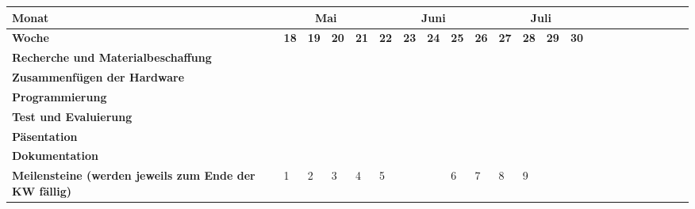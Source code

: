 \documentclass[lang=ngerman,inputenc=utf8,fontsize=10pt]{ldvarticle}
\begin{document}
\begin{center}
\begin{footnotesize}
\setlength{\arrayrulewidth}{1,05pt}
\begin{tabular}[htb]{|m{}|p{.05cm}|p{.05cm}|p{.05cm}|p{.05cm}|p{.05cm}|p{.05cm}|p{.05cm}|p{.05cm}|p{.05cm}|p{.05cm}|p{.05cm}|p{.05cm}|p{.05cm}|p{.05cm}|p{.05cm}|p{.05cm}|p{.05cm}|p{.05cm}|p{.05cm}|p{.05cm}|p{.05cm}|p{.05cm}|}
\hline
\textbf{Monat}& \multicolumn{4}{|c|}{Mai} & \multicolumn{5}{|c|}{Juni} & \multicolumn{4}{|c|}{Juli} \\
\hline
\textbf{Woche}&\tiny\textbf{18}&\tiny\textbf{19}&\tiny\textbf{20}&\tiny\textbf{21}& \tiny \textbf{22} & \tiny \textbf{23} & \tiny \textbf{24} & \tiny \textbf{25} & \tiny \textbf{26} & \tiny \textbf{27} & \tiny \textbf{28} & \tiny \textbf{29} & \tiny \textbf{30}\\
\hline

\rowcolor{lightgray} \textbf{Recherche und Materialbeschaffung}& \cellcolor{red} &\cellcolor{red} & & & & & & & & & & & \\
\hline
\rowcolor{lightgray} \textbf{Zusammenfügen der Hardware}& &\cellcolor{red} &\cellcolor{red} &\cellcolor{red} & & & & & & & & & \\
\hline
\rowcolor{lightgray} \textbf{Programmierung}& & &\cellcolor{red} &\cellcolor{red} &\cellcolor{red} &\cellcolor{red} &\cellcolor{red} &\cellcolor{red} &\cellcolor{red} &\cellcolor{red} & & & \\
\hline

\rowcolor{lightgray} \textbf{Test und Evaluierung}& & & & & &\cellcolor{red} &\cellcolor{red} &\cellcolor{red} & &\cellcolor{red} & & &\\
\hline
\rowcolor{lightgray} \textbf{Päsentation}&\cellcolor{red} & & & &\cellcolor{red} & & & & & & & &\\
\hline
\rowcolor{lightgray} \textbf{Dokumentation}&\cellcolor{red} &\cellcolor{red} &\cellcolor{red} &\cellcolor{red} &\cellcolor{red} &\cellcolor{red} & \cellcolor{red} & \cellcolor{red} & \cellcolor{red} &\cellcolor{red} &\cellcolor{red} &\cellcolor{red} &\cellcolor{red}\\
\hline
\rowcolor{lightgray} \textbf{Meilensteine (werden jeweils zum Ende der KW fällig)}&1 &2 &3 &4 &5 & & &6 &7 &8&9 & & \\
\hline

\end{tabular}
\end{footnotesize}
\end{center}
\end{document}
